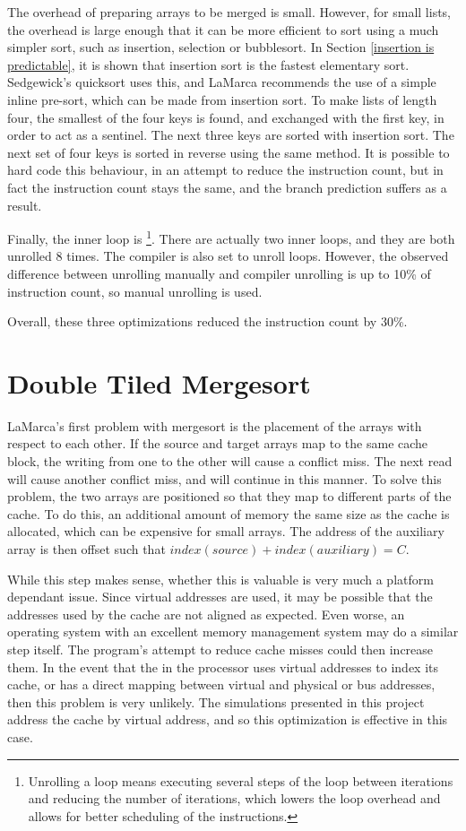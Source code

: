 The overhead of preparing arrays to be merged is small. However, for small
lists, the overhead is large enough that it can be more efficient to sort using
a much simpler sort, such as insertion, selection or bubblesort. In Section
\ref{insertion is predictable}, it is shown that insertion sort is the fastest
elementary sort.  Sedgewick's quicksort uses this, and LaMarca recommends the
use of a simple inline pre-sort, which can be made from insertion sort. To make
lists of length four, the smallest of the four keys is found, and exchanged
with the first key, in order to act as a sentinel. The next three keys are
sorted with insertion sort. The next set of four keys is sorted in reverse
using the same method. It is possible to hard code this behaviour, in an attempt
to reduce the instruction count, but in fact the instruction count stays the
same, and the branch prediction suffers as a result.

Finally, the inner loop is \footnote{Unrolling a loop means
executing several steps of the loop between iterations and reducing the number
of iterations, which lowers the loop overhead and allows for better scheduling
of the instructions.}. There are actually two inner loops, and they are both
unrolled 8 times. The compiler is also set to unroll loops. However, the
observed difference between unrolling manually and compiler unrolling is up to
10\% of instruction count, so manual unrolling is used.

Overall, these three optimizations reduced the instruction count by 30\%.

\section{Double Tiled Mergesort}
LaMarca's first problem with mergesort is the placement of the arrays with
respect to each other. If the source and target arrays map to the same cache
block, the writing from one to the other will cause a conflict miss. The next
read will cause another conflict miss, and will continue in this manner. To
solve this problem, the two arrays are positioned so that they map to different
parts of the cache. To do this, an additional amount of memory the same size as
the cache is allocated, which can be expensive for small arrays. The address of
the auxiliary array is then offset such that $index(source) + index(auxiliary) =
C$.


While this step makes sense, whether this is valuable is very much a platform
dependant issue. Since virtual addresses are used, it may be possible that the
addresses used by the cache are not aligned as expected. Even worse, an
operating system with an excellent memory management system may do a similar
step itself. The program's attempt to reduce cache misses could then increase
them. In the event that the  in the processor uses
virtual addresses to index its cache, or has a direct mapping between virtual
and physical or bus addresses, then this problem is very unlikely. The
simulations presented in this project address the cache by virtual address, and
so this optimization is effective in this case.

